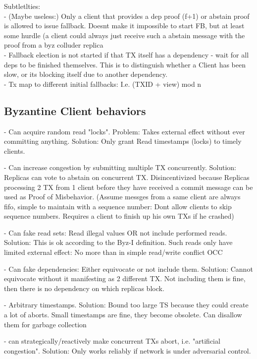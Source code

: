 Subtletlties:\\
- (Maybe useless:) Only a client that provides a dep proof (f+1) or abstain proof is allowed to issue fallback. Doesnt make it impossible to start FB, but at least some hurdle (a client could always just receive such a abstain message with the proof from a byz colluder replica\\
- Fallback election is not started if that TX itself has a dependency - wait for all deps to be finished themselves. This is to distinguish whether a Client has been slow, or its blocking itself due to another dependency.\\
- Tx map to different initial fallbacks: I.e. (TXID + view) mod n \\

\subsection{Byzantine Client behaviors}

- Can acquire random read "locks". Problem: Takes external effect without ever committing anything. Solution: Only grant Read timestamps (locks) to timely clients. 

- Can increase congestion by submitting multiple TX concurrently. Solution: Replicas can vote to abstain on concurrent TX. Disincentivized because Replicas processing 2 TX from 1 client before they have received a commit message can be used as Proof of Misbehavior. (Assume messges from a same client are always fifo, simple to maintain with a sequence number: Dont allow clients to skip sequence numbers. Requires a client to finish up his own TXs if he crashed)

- Can fake read sets: Read illegal values OR not include performed reads. Solution: This is ok according to the Byz-I definition. Such reads only have limited external effect: No more than in simple read/write conflict OCC

- Can fake dependencies: Either equivocate or not include them. Solution: Cannot equivocate without it manifesting as 2 different TX. Not including them is fine, then there is no dependency on which replicas block.

- Arbitrary timestamps. Solution: Bound too large TS because they could create a lot of aborts. Small timestamps are fine, they become obsolete. Can disallow them for garbage collection

- can strategically/reactively make concurrent TXs abort, i.e. "artificial congestion". Solution: Only works reliably if network is under adversarial control.

